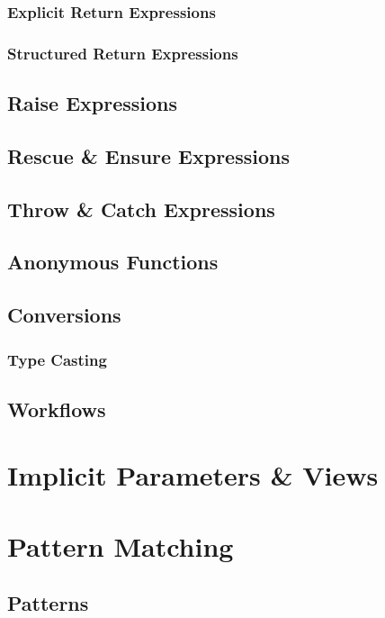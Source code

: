 \subsection{Explicit Return Expressions}

\subsection{Structured Return Expressions}

\section{Raise Expressions}

\section{Rescue \& Ensure Expressions}

\section{Throw \& Catch Expressions}

\section{Anonymous Functions}

\section{Conversions}

\subsection{Type Casting}

\section{Workflows}
\label{sec:workflows}

\chapter{Implicit Parameters \& Views}

\chapter{Pattern Matching}

\section{Patterns}
\label{sec:patterns}

